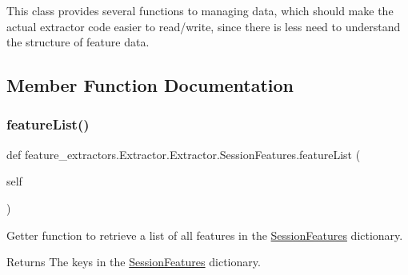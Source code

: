 This class provides several functions to managing data, which should make the actual extractor code easier to read/write, since there is less need to understand the structure of feature data. 

\subsection{Member Function Documentation}
\mbox{\label{classfeature__extractors_1_1_extractor_1_1_extractor_1_1_session_features_a5e4db04ec6f3c1359823f8ece468f955}} 
\subsubsection{\texorpdfstring{featureList()}{featureList()}}
{\footnotesize\ttfamily def feature\+\_\+extractors.\+Extractor.\+Extractor.\+Session\+Features.\+feature\+List (\begin{DoxyParamCaption}\item[{}]{self }\end{DoxyParamCaption})}



Getter function to retrieve a list of all features in the \mbox{\hyperlink{classfeature__extractors_1_1_extractor_1_1_extractor_1_1_session_features}{Session\+Features}} dictionary. 

\begin{DoxyReturn}{Returns}
The keys in the \mbox{\hyperlink{classfeature__extractors_1_1_extractor_1_1_extractor_1_1_session_features}{Session\+Features}} dictionary. 
\end{DoxyReturn}
\mbox{\label{classfeature__extractors_1_1_extractor_1_1_extractor_1_1_session_features_a3f528a465e33496604fe188f7a45b40d}} 

